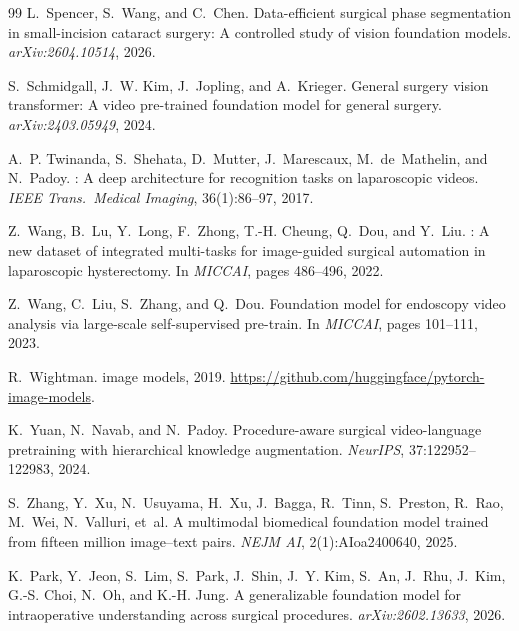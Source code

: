 \documentclass[10pt,twocolumn]{article}
\begin{document}
\begin{thebibliography}{99}
L.~Spencer, S.~Wang, and C.~Chen.
\newblock Data-efficient surgical phase segmentation in small-incision cataract
  surgery: A controlled study of vision foundation models.
\newblock \emph{arXiv:2604.10514}, 2026.

S.~Schmidgall, J.~W. Kim, J.~Jopling, and A.~Krieger.
\newblock General surgery vision transformer: A video pre-trained foundation
  model for general surgery.
\newblock \emph{arXiv:2403.05949}, 2024.

A.~P. Twinanda, S.~Shehata, D.~Mutter, J.~Marescaux, M.~de~Mathelin, and
  N.~Padoy.
: A deep architecture for recognition tasks on laparoscopic
  videos.
\newblock \emph{IEEE Trans.\ Medical Imaging}, 36(1):86--97, 2017.

Z.~Wang, B.~Lu, Y.~Long, F.~Zhong, T.-H. Cheung, Q.~Dou, and Y.~Liu.
: A new dataset of integrated multi-tasks for
  image-guided surgical automation in laparoscopic hysterectomy.
\newblock In \emph{MICCAI}, pages 486--496, 2022.

Z.~Wang, C.~Liu, S.~Zhang, and Q.~Dou.
\newblock Foundation model for endoscopy video analysis via large-scale
  self-supervised pre-train.
\newblock In \emph{MICCAI}, pages 101--111, 2023.

R.~Wightman.
 image models, 2019.
\newblock \url{https://github.com/huggingface/pytorch-image-models}.

K.~Yuan, N.~Navab, and N.~Padoy.
\newblock Procedure-aware surgical video-language pretraining with hierarchical
  knowledge augmentation.
\newblock \emph{NeurIPS}, 37:122952--122983, 2024.

S.~Zhang, Y.~Xu, N.~Usuyama, H.~Xu, J.~Bagga, R.~Tinn, S.~Preston, R.~Rao,
  M.~Wei, N.~Valluri, et~al.
\newblock A multimodal biomedical foundation model trained from fifteen million
  image--text pairs.
\newblock \emph{NEJM AI}, 2(1):AIoa2400640, 2025.

K.~Park, Y.~Jeon, S.~Lim, S.~Park, J.~Shin, J.~Y. Kim, S.~An, J.~Rhu, J.~Kim,
  G.-S. Choi, N.~Oh, and K.-H. Jung.
\newblock A generalizable foundation model for intraoperative understanding
  across surgical procedures.
\newblock \emph{arXiv:2602.13633}, 2026.

\end{thebibliography}
\end{document}
